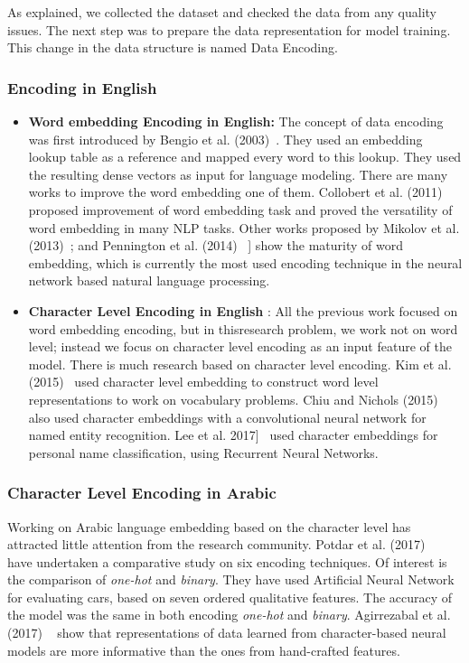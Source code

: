 As explained, we collected the dataset and checked the data from any quality issues. The next step was to prepare the data representation for model training. This change in the data structure is named Data Encoding.

\subsubsection{Encoding in English}

\begin{itemize}
 \item \textbf{Word embedding Encoding in English:} The concept of data encoding was first introduced by Bengio et al. (2003)~\cite{Bengio2003}. They used an embedding lookup table as a reference and mapped every word to this lookup. They used the resulting dense vectors as input for language modeling. There are many works to improve the word embedding one of them. Collobert et al. (2011)~\cite{Collobert_2011} proposed improvement of word embedding task and proved the versatility of word embedding in many NLP tasks. Other works proposed by Mikolov et al. (2013)~\cite{Mikolov_2013}; and Pennington et al. (2014)~\cite{Pennington_2014} ] show the maturity of word embedding, which is currently the most used encoding technique in the neural network based natural language processing.

 \item \textbf{Character Level Encoding in English} : All the previous work focused on word embedding encoding, but in thisresearch problem, we work not on word level; instead we focus on character level encoding as an input feature of the model. There is much research based on character level encoding. Kim et al. (2015)~\cite{Kim_2015} used character level embedding to construct word level representations to work on vocabulary problems. Chiu and Nichols (2015)~\cite{Chiu_2015} also used character embeddings with a convolutional neural network for named entity recognition. Lee et al. 2017]~\cite{ijcai_2017} used character embeddings for personal name classification, using Recurrent Neural Networks.

\end{itemize}

\subsubsection{Character Level Encoding in Arabic}\label{sec:Char_Level_Arabic}

Working on Arabic language embedding based on the character level has attracted little attention from the research community. Potdar et al. (2017) ~\cite{Potdar_2017} have undertaken a comparative study on six encoding techniques. Of interest is the comparison of \textit{one-hot} and \textit{binary}. They have used Artificial Neural Network for evaluating cars, based on seven ordered qualitative features. The accuracy of the model was the same in both encoding \textit{one-hot} and \textit{binary}. Agirrezabal et al. (2017) ~\cite{Agirrezabal_2017} show that representations of data learned from character-based neural models are more informative than the ones from hand-crafted features.

